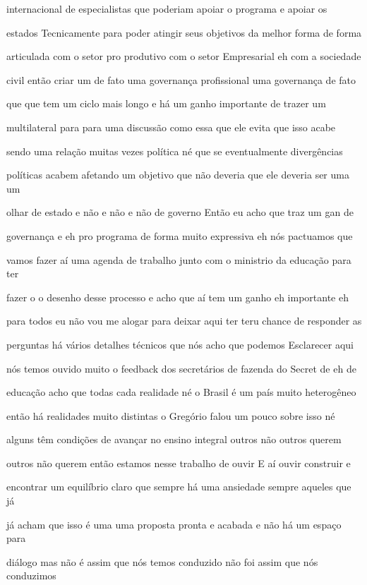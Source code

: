 \documentclass[a4paper,12pt]{article}
\begin{document}
internacional de especialistas que poderiam apoiar o programa e apoiar os

estados Tecnicamente para poder atingir seus objetivos da melhor forma de forma

articulada com o setor pro produtivo com o setor Empresarial eh com a sociedade

civil então criar um de fato uma governança profissional uma governança de fato

que que tem um ciclo mais longo e há um ganho importante de trazer um

multilateral para para uma discussão como essa que ele evita que isso acabe

sendo uma relação muitas vezes política né que se eventualmente divergências

políticas acabem afetando um objetivo que não deveria que ele deveria ser uma um

olhar de estado e não e não e não de governo Então eu acho que traz um gan de

governança e eh pro programa de forma muito expressiva eh nós pactuamos que

vamos fazer aí uma agenda de trabalho junto com o ministrio da educação para ter

fazer o o desenho desse processo e acho que aí tem um ganho eh importante eh

para todos eu não vou me alogar para deixar aqui ter teru chance de responder as

perguntas há vários detalhes técnicos que nós acho que podemos Esclarecer aqui

nós temos ouvido muito o feedback dos secretários de fazenda do Secret de eh de

educação acho que todas cada realidade né o Brasil é um país muito heterogêneo

então há realidades muito distintas o Gregório falou um pouco sobre isso né

alguns têm condições de avançar no ensino integral outros não outros querem

outros não querem então estamos nesse trabalho de ouvir E aí ouvir construir e

encontrar um equilíbrio claro que sempre há uma ansiedade sempre aqueles que já

já acham que isso é uma uma proposta pronta e acabada e não há um espaço para

diálogo mas não é assim que nós temos conduzido não foi assim que nós conduzimos
\end{document}
